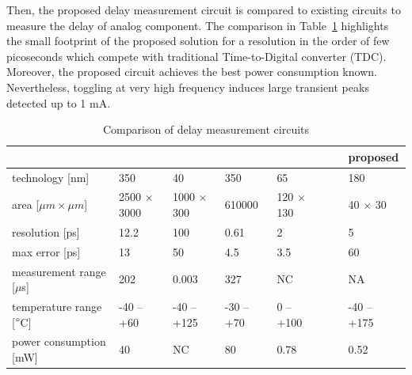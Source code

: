 Then, the proposed delay measurement circuit is compared to existing circuits to measure the delay of analog component. The comparison in Table~\ref{tbl:delay-measurement-comparison} highlights the small footprint of the proposed solution for a resolution in the order of few picoseconds which compete with traditional Time-to-Digital converter (TDC). Moreover, the proposed circuit achieves the best power consumption known. Nevertheless, toggling at very high frequency induces large transient peaks detected up to 1 mA. 

\renewcommand*{\thefootnote}{\fnsymbol{footnote}}
\begin{table}[htp]
    \centering
    \caption{Comparison of delay measurement circuits}
    \label{tbl:delay-measurement-comparison}
    \begin{tabular}{@{}llllllll@{}}
    \toprule
                                      & \cite{1637593} & \cite{6233014} & \cite{7312496} & \cite{7560219} &  &  & \textbf{proposed} \\ \midrule
    technology  [nm]                  & 350         & 40          & 350        & 65        &  &  & 180              \\
    area [\(\mu m \times \mu m\)]     & 2500 $\times$ 3000 & 1000 $\times$ 300  & 610000     & 120 $\times$ 130 &  &  & 40 $\times$ 30           \\
    resolution [ps]                   & 12.2        & 100         & 0.61       & 2         &  &  & 5\footnotemark                 \\
    max error [ps]                    & 13          & 50          & 4.5        & 3.5       &  &  & 60             \\
    measurement range [\(\mu\)s]      & 202         & 0.003       & 327        & NC        &  &  & NA             \\
    temperature range [\(\degree \)C] & -40 -- +60  & -40 -- +125 & -30 -- +70 & 0 -- +100 &  &  & -40 -- +175       \\
    power consumption [mW]            & 40          & NC          & 80         & 0.78      &  &  & 0.52              \\ \bottomrule
    \end{tabular}
\end{table}

\renewcommand*{\thefootnote}{\arabic{footnote}}
\setcounter{footnote}{0}

